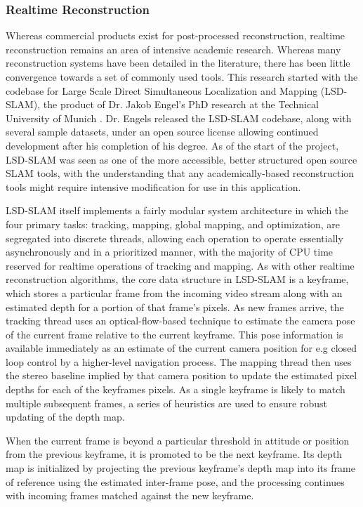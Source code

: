 \documentclass[letterpaper,12pt]{article}
\begin{document}
\subsubsection{Realtime Reconstruction}

Whereas commercial products exist for post-processed reconstruction, realtime reconstruction remains an area of intensive academic research.   Whereas many reconstruction systems have been detailed in the literature, there has been little convergence towards a set of commonly used tools.   This research started with the codebase for Large Scale Direct Simultaneous Localization and Mapping (LSD-SLAM), the product of Dr. Jakob Engel's PhD research at the Technical University of Munich \cite{engel2014lsd}.   Dr. Engels released the LSD-SLAM codebase, along with several sample datasets, under an open source license allowing continued development after his completion of his degree.   As of the start of the project, LSD-SLAM was seen as one of the more accessible, better structured open source SLAM tools, with the understanding that any academically-based reconstruction tools might require intensive modification for use in this application.

LSD-SLAM itself implements a fairly modular system architecture in which the four primary tasks: tracking, mapping, global mapping, and optimization, are segregated into discrete threads, allowing each operation to operate essentially asynchronously and in a prioritized manner, with the majority of CPU time reserved for realtime operations of tracking and mapping.   As with other realtime reconstruction algorithms, the core data structure in LSD-SLAM is a keyframe, which stores a particular frame from the incoming video stream along with an estimated depth for a portion of that frame's pixels.   As new frames arrive, the tracking thread uses an optical-flow-based technique to estimate the camera pose of the current frame relative to the current keyframe.  This pose information is available immediately as an estimate of the current camera position for e.g closed loop control by a higher-level navigation process.  The mapping thread then uses the stereo baseline implied by that camera position to update the estimated pixel depths for each of the keyframes pixels.   As a single keyframe is likely to match multiple subsequent frames, a series of heuristics are used to ensure robust updating of the depth map.

When the current frame is beyond a particular threshold in attitude or position from the previous keyframe, it is promoted to be the next keyframe.  Its depth map is initialized by projecting the previous keyframe's depth map into its frame of reference using the estimated inter-frame pose, and the processing continues with incoming frames matched against the new keyframe.
\end{document}
